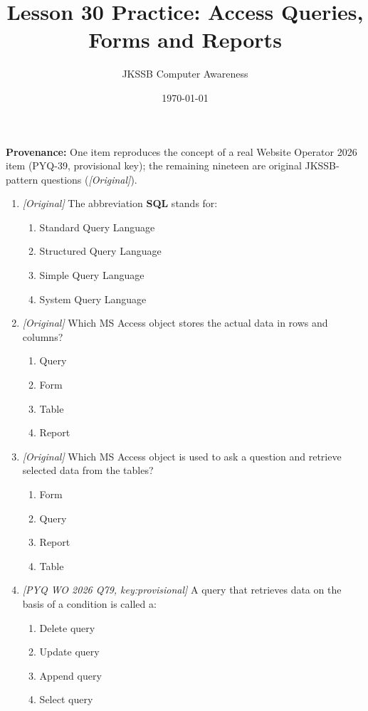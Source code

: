 \documentclass[11pt]{article}
\title{Lesson 30 Practice: Access Queries, Forms and Reports}
\author{JKSSB Computer Awareness}
\date{\today}
\begin{document}
\maketitle
\noindent\textbf{Provenance:} One item reproduces the concept of a real
Website Operator 2026 item (PYQ-39, provisional key); the remaining nineteen
are original JKSSB-pattern questions (\textit{[Original]}).

\begin{enumerate}[label=\textbf{Q\arabic*.}, leftmargin=*]
\item \textit{[Original]} The abbreviation \textbf{SQL} stands for:
  \begin{enumerate}[label=\Alph*.]
    \item Standard Query Language
    \item Structured Query Language
    \item Simple Query Language
    \item System Query Language
  \end{enumerate}
\item \textit{[Original]} Which MS Access object stores the actual data in
  rows and columns?
  \begin{enumerate}[label=\Alph*.]
    \item Query
    \item Form
    \item Table
    \item Report
  \end{enumerate}
\item \textit{[Original]} Which MS Access object is used to ask a question
  and retrieve selected data from the tables?
  \begin{enumerate}[label=\Alph*.]
    \item Form
    \item Query
    \item Report
    \item Table
  \end{enumerate}
\item \textit{[PYQ WO 2026 Q79, key:provisional]} A query that retrieves
  data on the basis of a condition is called a:
  \begin{enumerate}[label=\Alph*.]
    \item Delete query
    \item Update query
    \item Append query
    \item Select query
  \end{enumerate}

\end{enumerate}
\end{document}
